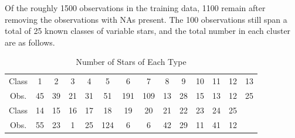 \documentclass[12pt]{article}
\begin{document}
Of the roughly 1500 observations in the training data, 1100 remain after removing the observations with NAs present.  The 100 observations still span a total of 25 known classes of variable stars, and the total number in each cluster are as follows.

\begin{table}[h]
\centering
\caption{Number of Stars of Each Type}
\begin{tabular}{c c c c c c c c c c c c c c}
\hline
Class & 1 & 2  & 3  & 4  & 5  & 6  & 7 & 8  & 9  & 10 & 11 & 12 & 13 \\
Obs.  &45 & 39 & 21 & 31 & 51 & 191 & 109 & 13 & 28 & 15 & 13  & 12 & 25 \\
\hline
Class & 14  & 15 & 16 & 17 & 18 & 19 & 20 & 21 & 22 & 23 & 24 & 25 &\\
Obs.  & 55 & 23 & 1 & 25  & 124 & 6 & 6 & 42 & 29 & 11 & 41 & 12 & \\
\hline
\end{tabular}
\end{table}

\end{document}
